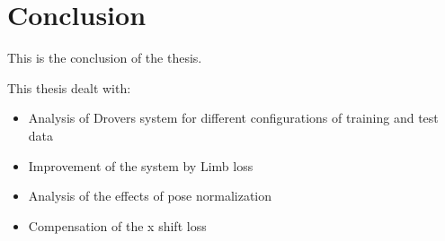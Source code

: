 \section{Conclusion}
This is the conclusion of the thesis.

This thesis dealt with:
\begin{itemize}
	\item Analysis of Drovers system for different configurations of training and test data
	\item Improvement of the system by Limb loss
	\item Analysis of the effects of pose normalization
	\item Compensation of the x shift loss
\end{itemize}